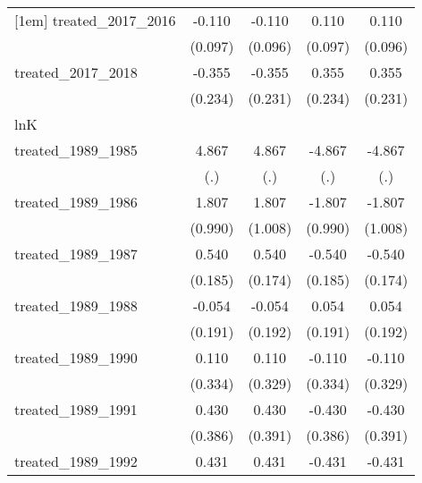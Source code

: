 {\begin{tabular}{l*{4}{c}}
[1em]
treated\_2017\_2016&      -0.110         &      -0.110         &       0.110         &       0.110         \\
            &     (0.097)         &     (0.096)         &     (0.097)         &     (0.096)         \\
[1em]
treated\_2017\_2018&      -0.355         &      -0.355         &       0.355         &       0.355         \\
            &     (0.234)         &     (0.231)         &     (0.234)         &     (0.231)         \\
\hline
lnK         &                     &                     &                     &                     \\
treated\_1989\_1985&       4.867         &       4.867         &      -4.867         &      -4.867         \\
            &         (.)         &         (.)         &         (.)         &         (.)         \\
[1em]
treated\_1989\_1986&       1.807         &       1.807         &      -1.807         &      -1.807         \\
            &     (0.990)         &     (1.008)         &     (0.990)         &     (1.008)         \\
[1em]
treated\_1989\_1987&       0.540\sym{**} &       0.540\sym{**} &      -0.540\sym{**} &      -0.540\sym{**} \\
            &     (0.185)         &     (0.174)         &     (0.185)         &     (0.174)         \\
[1em]
treated\_1989\_1988&      -0.054         &      -0.054         &       0.054         &       0.054         \\
            &     (0.191)         &     (0.192)         &     (0.191)         &     (0.192)         \\
[1em]
treated\_1989\_1990&       0.110         &       0.110         &      -0.110         &      -0.110         \\
            &     (0.334)         &     (0.329)         &     (0.334)         &     (0.329)         \\
[1em]
treated\_1989\_1991&       0.430         &       0.430         &      -0.430         &      -0.430         \\
            &     (0.386)         &     (0.391)         &     (0.386)         &     (0.391)         \\
[1em]
treated\_1989\_1992&       0.431         &       0.431         &      -0.431         &      -0.431         \\

\end{tabular}}
